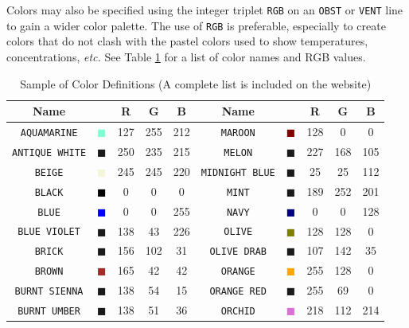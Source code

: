 \documentclass[11pt]{book}
\newcommand{\ct}{\tt\small}
\begin{document}
Colors may also be specified using the integer triplet {\ct RGB} on an {\ct OBST} or {\ct VENT} line to gain
a wider color palette. The use of {\ct RGB} is preferable, especially
to create colors that do not clash with the pastel colors used to
show temperatures, concentrations, {\em etc.} See Table \ref{tab:colors}
for a list of color names and RGB values.


\begin{table}[p]
\begin{center}
\caption{Sample of Color Definitions (A complete list is included on the website) }
\label{tab:colors}
\vspace{0.1in}
\begin{tabular}{|c|c|c|c|c|c||c|c|c|c|}
\hline
Name & &  R  & G & B & Name & & R & G & B   \\ \hline \hline
{\ct AQUAMARINE} & \textcolor{AQUAMARINE} {$\blacksquare$} & 127& 255& 212& {\ct MAROON} &  \textcolor{MAROON} {$\blacksquare$} & 128& 0& 0  \\ \hline
{\ct ANTIQUE WHITE} & \textcolor{ANTIQUE WHITE} {$\blacksquare$} & 250& 235& 215& {\ct MELON} &  \textcolor{MELON} {$\blacksquare$} & 227& 168& 105  \\ \hline
{\ct BEIGE} & \textcolor{BEIGE} {$\blacksquare$} & 245& 245& 220& {\ct MIDNIGHT BLUE} &  \textcolor{MIDNIGHT BLUE} {$\blacksquare$} & 25& 25& 112  \\ \hline
{\ct BLACK} & \textcolor{BLACK} {$\blacksquare$} & 0& 0& 0& {\ct MINT} &  \textcolor{MINT} {$\blacksquare$} & 189& 252& 201  \\ \hline
{\ct BLUE} & \textcolor{BLUE} {$\blacksquare$} & 0& 0& 255& {\ct NAVY} &  \textcolor{NAVY} {$\blacksquare$} & 0& 0& 128  \\ \hline
{\ct BLUE VIOLET} & \textcolor{BLUE VIOLET} {$\blacksquare$} & 138& 43& 226& {\ct OLIVE} &  \textcolor{OLIVE} {$\blacksquare$} & 128& 128& 0  \\ \hline
{\ct BRICK} & \textcolor{BRICK} {$\blacksquare$} & 156& 102& 31& {\ct OLIVE DRAB} &  \textcolor{OLIVE DRAB} {$\blacksquare$} & 107& 142& 35  \\ \hline
{\ct BROWN} & \textcolor{BROWN} {$\blacksquare$} & 165& 42& 42& {\ct ORANGE} &  \textcolor{ORANGE} {$\blacksquare$} & 255& 128& 0  \\ \hline
{\ct BURNT SIENNA} & \textcolor{BURNT SIENNA} {$\blacksquare$} & 138& 54& 15& {\ct ORANGE RED} &  \textcolor{ORANGE RED} {$\blacksquare$} & 255& 69& 0  \\ \hline
{\ct BURNT UMBER} & \textcolor{BURNT UMBER} {$\blacksquare$} & 138& 51& 36& {\ct ORCHID} &  \textcolor{ORCHID} {$\blacksquare$} & 218& 112& 214  \\ \hline

\end{tabular}
\end{center}
\end{table}
\end{document}
